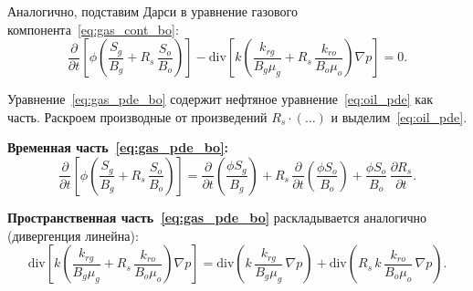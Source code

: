 ﻿\documentclass[12pt,a4paper]{article}
\begin{document}
Аналогично, подставим Дарси в уравнение
газового компонента~\eqref{eq:gas_cont_bo}:
\begin{equation}\label{eq:gas_pde_bo}
  \frac{\partial}{\partial t}\left[\phi\left(\frac{S_g}{B_g}
  + R_s\,\frac{S_o}{B_o}\right)\right]
  - \mathrm{div}\left[k\left(\frac{k_{rg}}{B_g\mu_g}
  + R_s\,\frac{k_{ro}}{B_o\mu_o}\right)\nabla p\right] = 0.
\end{equation}

Уравнение~\eqref{eq:gas_pde_bo} содержит
нефтяное уравнение~\eqref{eq:oil_pde} как часть.
Раскроем производные от произведений $R_s \cdot (\ldots)$
и выделим~\eqref{eq:oil_pde}.

\medskip\noindent
\textbf{Временная часть~\eqref{eq:gas_pde_bo}:}
\begin{equation}\label{eq:time_expand}
  \frac{\partial}{\partial t}\left[\phi\left(\frac{S_g}{B_g}
  + R_s\,\frac{S_o}{B_o}\right)\right]
  = \frac{\partial}{\partial t}\left(\frac{\phi S_g}{B_g}\right)
  + R_s\,\frac{\partial}{\partial t}\left(\frac{\phi S_o}{B_o}\right)
  + \frac{\phi S_o}{B_o}\,\frac{\partial R_s}{\partial t}.
\end{equation}

\noindent
\textbf{Пространственная часть~\eqref{eq:gas_pde_bo}}
раскладывается аналогично (дивергенция линейна):
\begin{equation}\label{eq:div_expand}
  \mathrm{div}\left[k\left(\frac{k_{rg}}{B_g\mu_g}
  + R_s\,\frac{k_{ro}}{B_o\mu_o}\right)\nabla p\right]
  = \mathrm{div}\left(k\,\frac{k_{rg}}{B_g\mu_g}\,\nabla p\right)
  + \mathrm{div}\left(R_s\,k\,\frac{k_{ro}}{B_o\mu_o}\,\nabla p\right).
\end{equation}
\end{document}
